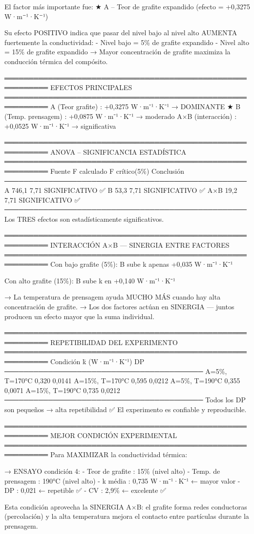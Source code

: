 \documentclass[
]{article}
\begin{document}
El factor más importante fue: ★ A -- Teor de grafite expandido (efecto =
+0,3275 W·m⁻¹·K⁻¹)

Su efecto POSITIVO indica que pasar del nivel bajo al nivel alto AUMENTA
fuertemente la conductividad: - Nivel bajo = 5\% de grafite expandido -
Nivel alto = 15\% de grafite expandido → Mayor concentración de grafite
maximiza la conducción térmica del compósito.

═══════════════════════════════════════════════════════════ EFECTOS
PRINCIPALES ═══════════════════════════════════════════════════════════
A (Teor grafite) : +0,3275 W·m⁻¹·K⁻¹ → DOMINANTE ★ B (Temp. prensagem) :
+0,0875 W·m⁻¹·K⁻¹ → moderado A×B (interacción) : +0,0525 W·m⁻¹·K⁻¹ →
significativa

═══════════════════════════════════════════════════════════ ANOVA --
SIGNIFICANCIA ESTADÍSTICA
═══════════════════════════════════════════════════════════ Fuente F
calculado F crítico(5\%) Conclusión
────────────────────────────────────────────────── A 746,1 7,71
SIGNIFICATIVO ✅ B 53,3 7,71 SIGNIFICATIVO ✅ A×B 19,2 7,71
SIGNIFICATIVO ✅ ────────────────────────────────────────────────── Los
TRES efectos son estadísticamente significativos.

═══════════════════════════════════════════════════════════ INTERACCIÓN
A×B --- SINERGIA ENTRE FACTORES
═══════════════════════════════════════════════════════════ Con bajo
grafite (5\%): B sube k apenas +0,035 W·m⁻¹·K⁻¹

Con alto grafite (15\%): B sube k en +0,140 W·m⁻¹·K⁻¹

→ La temperatura de prensagem ayuda MUCHO MÁS cuando hay alta
concentración de grafite. → Los dos factores actúan en SINERGIA ---
juntos producen un efecto mayor que la suma individual.

═══════════════════════════════════════════════════════════
REPETIBILIDAD DEL EXPERIMENTO
═══════════════════════════════════════════════════════════ Condición k̄
(W·m⁻¹·K⁻¹) DP ───────────────────────────────────────── A=5\%, T=170°C
0,320 0,0141 A=15\%, T=170°C 0,595 0,0212 A=5\%, T=190°C 0,355 0,0071
A=15\%, T=190°C 0,735 0,0212 ─────────────────────────────────────────
Todos los DP son pequeños → alta repetibilidad ✅ El experimento es
confiable y reproducible.

═══════════════════════════════════════════════════════════ MEJOR
CONDICIÓN EXPERIMENTAL
═══════════════════════════════════════════════════════════ Para
MAXIMIZAR la conductividad térmica:

→ ENSAYO condición 4: - Teor de grafite : 15\% (nivel alto) - Temp. de
prensagem : 190°C (nivel alto) - k média : 0,735 W·m⁻¹·K⁻¹ ← mayor valor
- DP : 0,021 ← repetible ✅ - CV : 2,9\% ← excelente ✅

Esta condición aprovecha la SINERGIA A×B: el grafite forma redes
conductoras (percolación) y la alta temperatura mejora el contacto entre
partículas durante la prensagem.
\end{document}
